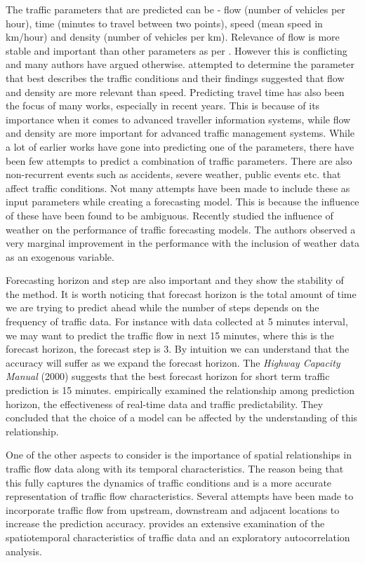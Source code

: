 The traffic parameters that are predicted can be - flow (number of vehicles per hour), time (minutes
to travel between two points), speed (mean speed in km/hour) and density (number of vehicles per km).
Relevance of flow is more stable and important than other parameters as per \citet{levin1980forecasting}.
However this is conflicting and many authors have argued otherwise. \citet{dougherty1997short} attempted
to determine the parameter that best describes the traffic conditions and their findings suggested that
flow and density are more relevant than speed. Predicting travel time has also been the focus of many
works, especially in recent years. This is because of its importance when it comes to advanced traveller
information systems, while flow and density are more important for advanced traffic management systems.
While a lot of earlier works have gone into predicting one of the parameters, there have been few
attempts to predict a combination of traffic parameters. There are also non-recurrent events such as
accidents, severe weather, public events etc. that affect traffic conditions. Not many attempts have
been made to include these as input parameters while creating a forecasting model. This is because
the influence of these have been found to be ambiguous. Recently \citet{tsirigotis2012does}
studied the influence of weather on the performance of traffic forecasting models. The authors observed
a very marginal improvement in the performance with the inclusion of weather data as an exogenous
variable.

Forecasting horizon and step are also important and they show the stability of the method. It is worth
noticing that forecast horizon is the total amount of time we are trying to predict ahead while
the number of steps depends on the frequency of traffic data. For instance with data collected at 5 minutes interval,
we may want to predict the traffic flow in next 15 minutes, where this is the forecast horizon, the
forecast step is 3. By intuition we can understand that the accuracy will suffer as we expand the
forecast horizon. The \textit{Highway Capacity Manual} (2000) suggests that the best forecast horizon
for short term traffic prediction is 15 minutes. \citet{yue2007prediction} empirically examined the
relationship among prediction horizon, the effectiveness of real-time data and traffic predictability.
They concluded that the choice of a model can be affected by the understanding of this relationship.

One of the other aspects to consider is the importance of spatial relationships in traffic flow data
along with its temporal characteristics. The reason being that this fully captures the dynamics of
traffic conditions and is a more accurate representation of traffic flow characteristics. Several
attempts have been made to incorporate traffic flow from upstream, downstream and adjacent locations
to increase the prediction accuracy. \citet{cheng2012spatio} provides an extensive examination of the
spatiotemporal characteristics of traffic data and an exploratory autocorrelation analysis.

